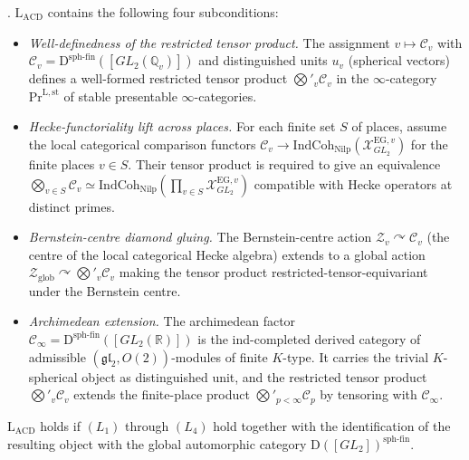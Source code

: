 \begin{theorem}
\label{v4-arith:acd:thm:modular-decomposition}
\ClaimStatusProvedHere. \(\mathrm{L}_{\mathrm{ACD}}\) contains the
following four subconditions:
\begin{itemize}
\item[\((L_{1})\)] \emph{Well-definedness of the restricted tensor
product.} The assignment \(v\mapsto\mathcal{C}_{v}\) with
\(\mathcal{C}_{v}=\mathrm{D}^{\mathrm{sph\text{-}fin}}([GL_{2}(\mathbb{Q}_{v})])\)
and distinguished units \(u_{v}\) (spherical vectors) defines a
well-formed restricted tensor product \(\bigotimes'_{v}\mathcal{C}_{v}\)
in the \(\infty\)-category \(\mathrm{Pr}^{\mathrm{L,st}}\) of stable
presentable \(\infty\)-categories.
\item[\((L_{2})\)] \emph{Hecke-functoriality lift across places.} For
each finite set \(S\) of places, assume the local categorical
comparison functors
\(\mathcal{C}_{v}\to\mathrm{IndCoh}_{\mathrm{Nilp}}(\mathcal{X}^{\mathrm{EG},v}_{GL_{2}})\)
for the finite places \(v\in S\).  Their tensor product is required to
give an equivalence
\(\bigotimes_{v\in S}\mathcal{C}_{v}\simeq\mathrm{IndCoh}_{\mathrm{Nilp}}(\prod_{v\in S}\mathcal{X}^{\mathrm{EG},v}_{GL_{2}})\)
compatible with Hecke operators at distinct primes.
\item[\((L_{3})\)] \emph{Bernstein-centre diamond gluing.} The
Bernstein-centre action
\(\mathcal{Z}_{v}\curvearrowright\mathcal{C}_{v}\) (the centre of the
local categorical Hecke algebra) extends to a global action
\(\mathcal{Z}_{\mathrm{glob}}\curvearrowright\bigotimes'_{v}\mathcal{C}_{v}\)
making the tensor product restricted-tensor-equivariant under the
Bernstein centre.
\item[\((L_{4})\)] \emph{Archimedean extension.} The archimedean
factor \(\mathcal{C}_{\infty}=\mathrm{D}^{\mathrm{sph\text{-}fin}}([GL_{2}(\mathbb{R})])\)
is the ind-completed derived category of admissible
\((\mathfrak{gl}_{2},O(2))\)-modules of finite \(K\)-type.  It carries
the trivial \(K\)-spherical object as distinguished unit, and the
restricted tensor product
\(\bigotimes'_{v}\mathcal{C}_{v}\) extends the finite-place product
\(\bigotimes'_{p<\infty}\mathcal{C}_{p}\) by tensoring with
\(\mathcal{C}_{\infty}\).
\end{itemize}
\(\mathrm{L}_{\mathrm{ACD}}\) holds if \((L_{1})\) through
\((L_{4})\) hold together with the identification of the resulting
object with the global automorphic category
\(\mathrm{D}([GL_{2}])^{\mathrm{sph\text{-}fin}}\).
\end{theorem}

